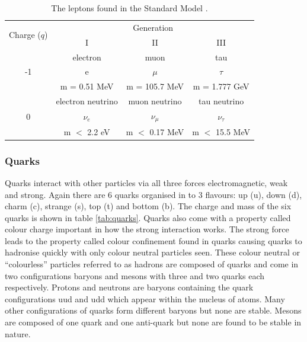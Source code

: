    \begin {table}[h]
        \begin{center}
        \begin{tabular}{|c|c|c|c|}
            \hline
            \multirow{2}{*}{Charge ($q$)}      & \multicolumn{3}{c|}{Generation} \\
            \cline{2-4}
                                & I     & II    & III   \\
            \hline
            \multirow{3}{*}{\Large -1} & electron & muon & tau \\
                                & {\Huge e}     & {\Huge $\mu$} & {\Huge $\tau$} \\
                                & m = 0.51 MeV  & m = 105.7 MeV & m = 1.777 GeV \\
            \hline
            \multirow{3}{*}{\Large 0} & electron neutrino & muon neutrino & tau neutrino \\
                                & {\Huge $\nu_{e}$} & {\Huge $\nu_{\mu}$} & {\Huge $\nu_{\tau}$}     \\
                                & m $<$ 2.2 eV      & m $<$ 0.17 MeV      & m $<$ 15.5 MeV \\
            \hline
        \end{tabular}
        \caption{The leptons found in the Standard Model \cite{ulrik:GriffEP2008}.}
        \label{tab:leptons}
        \end{center}
    \end {table}
 
    \subsubsection*{Quarks}
    Quarks interact with other particles via all three forces electromagnetic, weak and strong. Again there are 6 quarks organised in to 3 flavours: up (u), down (d), charm (c), strange (s), top (t) and bottom (b). The charge and mass of the six quarks is shown in table \ref{tab:quarks}. Quarks also come with a property called colour charge important in how the strong interaction works. The strong force leads to the property called colour confinement found in quarks causing quarks to hadronise quickly with only colour neutral particles seen. These colour neutral or ``colourless'' particles referred to as hadrons are composed of quarks and come in two configurations baryons and mesons with three and two quarks each respectively. Protons and neutrons are baryons containing the quark configurations uud and udd which appear within the nucleus of atoms. Many other configurations of quarks form different baryons but none are stable. Mesons are composed of one quark and one anti-quark but none are found to be stable in nature. 

